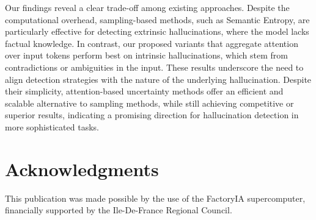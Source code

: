 \documentclass[letterpaper]{article} %
\begin{document}
Our findings reveal a clear trade-off among existing approaches. Despite the computational overhead, sampling-based methods, such as Semantic Entropy, are particularly effective for detecting extrinsic hallucinations, where the model lacks factual knowledge. In contrast, our proposed variants that aggregate attention over input tokens perform best on intrinsic hallucinations, which stem from contradictions or ambiguities in the input. These results underscore the need to align detection strategies with the nature of the underlying hallucination. Despite their simplicity, attention-based uncertainty methods offer an efficient and scalable alternative to sampling methods, while still achieving competitive or superior results, indicating a promising direction for hallucination detection in more sophisticated tasks.

\section*{Acknowledgments}
This publication was made possible by the use of the FactoryIA supercomputer, financially supported by the Ile-De-France Regional Council.

\small 

\end{document}
